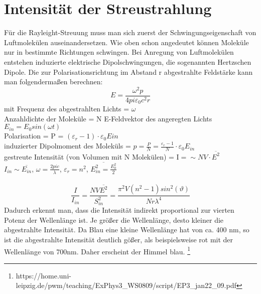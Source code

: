 \section{ Intensität der Streustrahlung}
Für die Rayleight-Streuung muss man sich zuerst der Schwingungseigenschaft von Luftmolekülen auseinandersetzen. Wie oben schon angedeutet können Moleküle nur in bestimmte Richtungen schwingen. Bei Anregung von Luftmolekülen entstehen induzierte elektrische Dipolschwingungen, die sogenannten Hertzschen Dipole. 
Die zur Polarisationsrichtung im Abstand r abgestrahlte Feldstärke kann man folgendermaßen berechnen:
\begin{equation}
E=\frac{\omega^2p}{4pi\varepsilon_0c^2r}
\end{equation}
mit Frequenz des abgestrahlten Lichts = $\omega$\\
Anzahldichte der Moleküle = N
E-Feldvektor des angeregten Lichts $E_{in}=E_0sin(\omega t)$\\
Polarisation = P = $(\varepsilon_r-1)\cdot\varepsilon_0E{in}$\\
induzierter Dipolmoment des Moleküls = $p=\frac{P}{N}=\frac{\varepsilon_r-1}{N}\cdot\varepsilon_0E_{in}$\\
gestreute Intensität (von Volumen mit N Molekülen) = I$=\sim NV\cdot\overline{E^2}$\\
$I_{in}\sim\overline{E_{in}}$, $\omega=\frac{2pic}{\lambda}$, $\varepsilon_r=n^2$, $\overline{E^2_{in}=\frac{E_0^2}{2}}$  \\\\
\begin{equation}
\frac{I}{I_{in}}=\frac{NV\overline{E^2}}{S^2_{in}}=\frac{\pi^2V(n^2-1)sin^2(\vartheta)}{Nr\lambda^4}
\end{equation}
Dadurch erkennt man, dass die Intensität indirekt proportional zur vierten Potenz der Wellenlänge ist. Je größer die Wellenlänge, desto kleiner die abgestrahlte Intensität. Da Blau eine kleine Wellenlänge hat von ca. 400 nm, so ist die abgestrahlte Intensität deutlich gößer, als beispielsweise rot mit der Wellenlänge von 700nm.  Daher erscheint der Himmel blau. 
\footnote{https://home.uni-leipzig.de/pwm/teaching/ExPhys3_WS0809/script/EP3_jan22_09.pdf}


